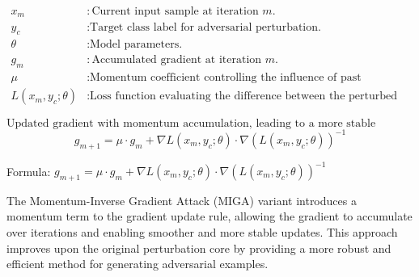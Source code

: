 \[
\begin{aligned}
x_m & : \text{Current input sample at iteration } m. \\
y_c & : \text{Target class label for adversarial perturbation.} \\
\theta & : \text{Model parameters.} \\
g_m & : \text{Accumulated gradient at iteration } m. \\
\mu & : \text{Momentum coefficient controlling the influence of past gradients.} \\
L(x_m, y_c; \theta) & : \text{Loss function evaluating the difference between the perturbed sample and the target.}
\end{aligned}
\]

\[
\text{Updated gradient with momentum accumulation, leading to a more stable adversarial perturbation.}
\]
\[
g_{m+1} = \mu \cdot g_m + \nabla L(x_m, y_c; \theta) \cdot \nabla(L(x_m, y_c; \theta))^{-1}
\]


 Formula: $g_{m+1} = \mu \cdot g_m + \nabla L(x_m, y_c; \theta) \cdot \nabla(L(x_m, y_c; \theta))^{-1}$

The Momentum-Inverse Gradient Attack (MIGA) variant introduces a momentum term to the gradient update rule, allowing the gradient to accumulate over iterations and enabling smoother and more stable updates. This approach improves upon the original perturbation core by providing a more robust and efficient method for generating adversarial examples.